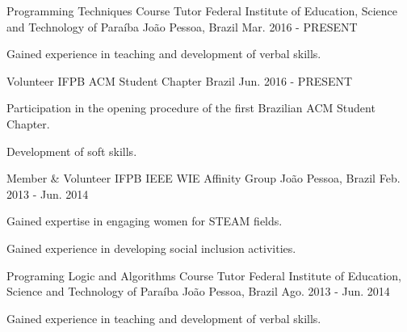\begin{cventries}
  \cventry
    {Programming Techniques Course Tutor} %
    {Federal Institute of Education, Science and Technology of Paraíba} %
    {João Pessoa, Brazil} %
    {Mar. 2016 - PRESENT} %
    {
      \begin{cvitems} %
        \item {Gained experience in teaching and development of verbal skills.}
      \end{cvitems}
    }
  \cventry
    {Volunteer} %
    {IFPB ACM Student Chapter} %
    {Brazil} %
    {Jun. 2016 - PRESENT} %
    {
      \begin{cvitems} %
        \item {Participation in the opening procedure of  the first Brazilian ACM Student Chapter.}
        \item {Development of soft skills.}
      \end{cvitems}
    }
  \cventry
    {Member \& Volunteer} %
    {IFPB IEEE WIE Affinity Group} %
    {João Pessoa, Brazil} %
    {Feb. 2013 - Jun. 2014} %
    {
      \begin{cvitems} %
		\item{Gained expertise in engaging women for STEAM fields.}
		\item{Gained experience in developing social inclusion activities.}
      \end{cvitems}
    }
  \cventry
    {Programing Logic and Algorithms Course Tutor} %
    {Federal Institute of Education, Science and Technology of Paraíba} %
    {João Pessoa, Brazil} %
    {Ago. 2013 - Jun. 2014} %
    {
      \begin{cvitems} %
        \item {Gained experience in teaching and development of verbal skills.}
      \end{cvitems}
    }
\end{cventries}
